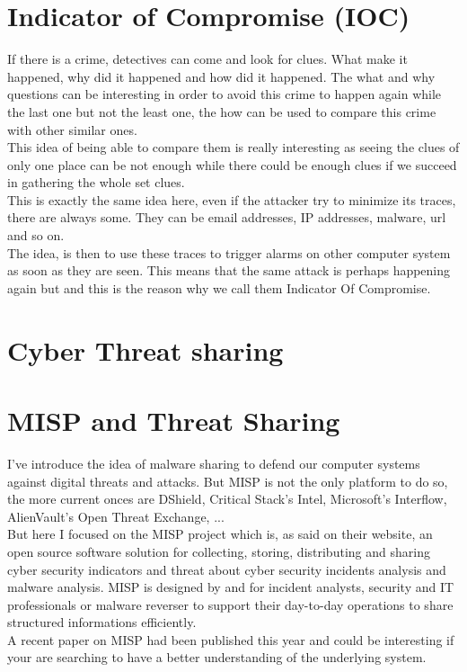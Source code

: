 \documentclass{eplmastersthesis}
\begin{document}
\section{Indicator of Compromise (IOC)}
If there is a crime, detectives can come and look for clues. What make it happened, why did it happened and how did it happened. The what and why questions can be interesting in order to avoid this crime to happen again while the last one but not the least one, the how can be used to compare this crime with other similar ones.\\
This idea of being able to compare them is really interesting as seeing the clues of only one place can be not enough while there could be enough clues if we succeed in gathering the whole set clues.\\
This is exactly the same idea here, even if the attacker try to minimize its traces, there are always some. They can be email addresses, IP addresses, malware, url and so on.\\
The idea, is then to use these traces to trigger alarms on other computer system as soon as they are seen. This means that the same attack is perhaps happening again but and this is the reason why we call them Indicator Of Compromise.


\section{Cyber Threat sharing}


\section{MISP and Threat Sharing}
I've introduce the idea of malware sharing to defend our computer systems against digital threats and attacks. But MISP is not the only platform to do so, the more current onces are DShield, Critical Stack’s Intel, Microsoft’s Interflow, AlienVault’s Open Threat Exchange, ...\\
But here I focused on the MISP project which is, as said on their website, an open source software solution for collecting, storing, distributing and sharing cyber security indicators and threat about cyber security incidents analysis and malware analysis. MISP is designed by and for incident analysts, security and IT professionals or malware reverser to support their day-to-day operations to share structured informations efficiently.\\
A recent paper on MISP \cite{wagner2016misp} had been published this year and could be interesting if your are searching to have a better understanding of the underlying system.
\end{document}
